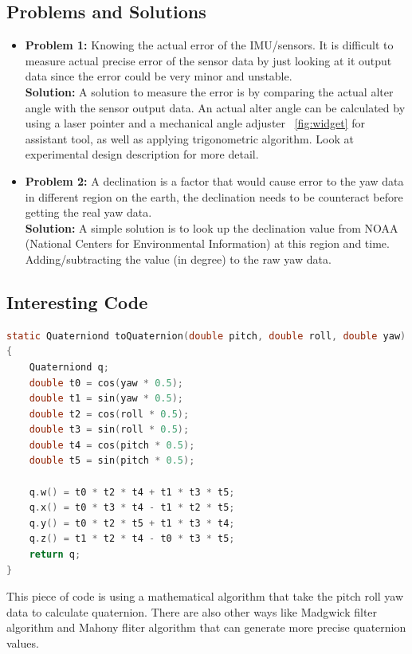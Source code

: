 \subsection{Problems and Solutions}
\begin{itemize}
	\item \textbf{Problem 1:}
	Knowing the actual error of the IMU/sensors. It is difficult to measure actual precise error of the sensor data by just looking at it output data since the error could be very minor and unstable.\\

	\textbf{Solution:}
	A solution to measure the error is by comparing the actual alter angle with the sensor output data. An actual alter angle can be calculated by using a laser pointer and a mechanical angle adjuster ~\ref{fig:widget} for assistant tool, as well as applying trigonometric algorithm. Look at experimental design description for more detail.\\

	\item \textbf{Problem 2:}
	A declination is a factor that would cause error to the yaw data in different region on the earth, the declination needs to be counteract before getting the real yaw data.\\

	\textbf{Solution:}
	A simple solution is to look up the declination value from NOAA (National Centers for Environmental Information) at this region and time. Adding/subtracting the value (in degree) to the raw yaw data.

\end{itemize}



\subsection{Interesting Code}
\begin{lstlisting}[language=c]
static Quaterniond toQuaternion(double pitch, double roll, double yaw)
{
	Quaterniond q;
	double t0 = cos(yaw * 0.5);
	double t1 = sin(yaw * 0.5);
	double t2 = cos(roll * 0.5);
	double t3 = sin(roll * 0.5);
	double t4 = cos(pitch * 0.5);
	double t5 = sin(pitch * 0.5);

	q.w() = t0 * t2 * t4 + t1 * t3 * t5;
	q.x() = t0 * t3 * t4 - t1 * t2 * t5;
	q.y() = t0 * t2 * t5 + t1 * t3 * t4;
	q.z() = t1 * t2 * t4 - t0 * t3 * t5;
	return q;
}
\end{lstlisting}

This piece of code is using a mathematical algorithm that take the pitch roll yaw data to calculate quaternion. There are also other ways like Madgwick filter algorithm and Mahony fliter algorithm that can generate more precise quaternion values.\\

